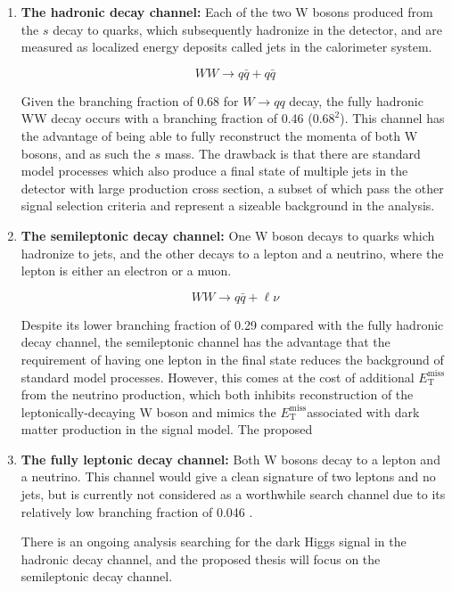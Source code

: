 \documentclass[12pt]{article}
\newcommand*{\met}{\ensuremath{E_\text{T}^\text{miss}}}
\begin{document}
\begin{enumerate}

\item \textbf{The hadronic decay channel:} Each of the two W bosons produced from the $s$ decay to quarks, which subsequently hadronize in the detector, and are measured as localized energy deposits called jets in the calorimeter system.

\begin{equation}
\nonumber
WW \rightarrow q\bar{q}+q\bar{q}
\end{equation}

Given the branching fraction of 0.68 \cite{PDG} for $W \rightarrow qq$ decay, the fully hadronic WW decay occurs with a branching fraction of 0.46 ($0.68^2$). This channel has the advantage of being able to fully reconstruct the momenta of both W bosons, and as such the $s$ mass. The drawback is that there are standard model processes which also produce a final state of multiple jets in the detector with large production cross section, a subset of which pass the other signal selection criteria and represent a sizeable background in the analysis. 

\item \textbf{The semileptonic decay channel:} One W boson decays to quarks which hadronize to jets, and the other decays to a lepton and a neutrino, where the lepton is either an electron or a muon. 

\begin{equation}
\nonumber
WW \rightarrow q\bar{q}+\ell\nu
\end{equation}

Despite its lower branching fraction of 0.29 \cite{PDG} compared with the fully hadronic decay channel, the semileptonic channel has the advantage that the requirement of having one lepton in the final state reduces the background of standard model processes. However, this comes at the cost of additional \met from the neutrino production, which both inhibits reconstruction of the leptonically-decaying W boson and mimics the \met associated with dark matter production in the signal model. The proposed 

\item \textbf{The fully leptonic decay channel:} Both W bosons decay to a lepton and a neutrino. This channel would give a clean signature of two leptons and no jets, but is currently not considered as a worthwhile search channel due to its relatively low branching fraction of 0.046 \cite{PDG}.

There is an ongoing analysis searching for the dark Higgs signal in the hadronic decay channel, and the proposed thesis will focus on the semileptonic decay channel. 

\end{enumerate}
\end{document}
